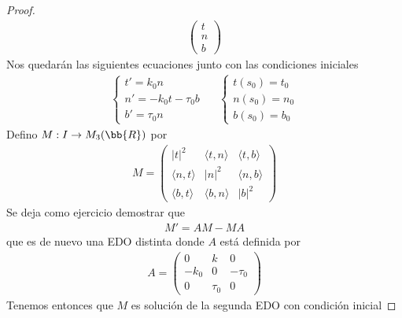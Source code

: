 \begin{teo}
\begin{proof}
\begin{gather*}
\begin{pmatrix}
                t\\
                n\\
                b
            \end{pmatrix}
        \end{gather*}
        Nos quedarán las siguientes ecuaciones junto con las condiciones iniciales
        \begin{gather*}
            \left\{
                \begin{array}{l}
                    t'=k_0n\\
                    n'=-k_0t - \tau_0 b \\
                    b' = \tau_0 n
                \end{array}
            \right. \ \ \ \ \ \ 
            \left\{
                \begin{array}{l}
                    t(s_0) = t_0\\
                    n(s_0) = n_0\\
                    b(s_0) = b_0
                \end{array}
            \right.
        \end{gather*}
        Defino $M:I \to M_3(\bb{R})$ por 
        \begin{gather*}
            M = \begin{pmatrix}
                |t|^2 & \langle t,n \rangle & \langle t,b \rangle \\
                \langle n,t \rangle & |n|^2 & \langle n,b \rangle \\
                \langle b,t \rangle & \langle b,n \rangle & |b|^2
            \end{pmatrix}
        \end{gather*}
        Se deja como ejercicio demostrar que 
        \begin{gather*}
            M' = AM - MA
        \end{gather*}
        que es de nuevo una EDO distinta donde $A$ está definida por 
        \begin{gather*}
            A = \begin{pmatrix}
                0 & k & 0\\
                -k_0 & 0 & -\tau_0\\
                0 & \tau_0 & 0
            \end{pmatrix}
        \end{gather*}
        Tenemos entonces que $M$ es solución de la segunda EDO con condición inicial

\end{proof}
\end{teo}
